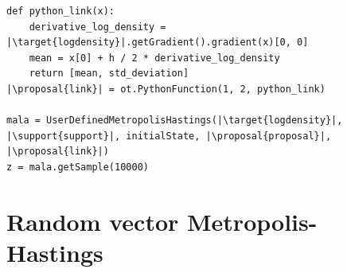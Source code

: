 \documentclass{beamer}
\newcommand{\target}[1]{\textcolor{red}{#1}}
\newcommand{\proposal}[1]{\textcolor{blue}{#1}}
\newcommand{\support}[1]{\textcolor{orange}{#1}}
\begin{document}
\begin{frame}[containsverbatim]
\begin{lstlisting}
def python_link(x):
    derivative_log_density = |\target{logdensity}|.getGradient().gradient(x)[0, 0]
    mean = x[0] + h / 2 * derivative_log_density
    return [mean, std_deviation]
|\proposal{link}| = ot.PythonFunction(1, 2, python_link)

mala = UserDefinedMetropolisHastings(|\target{logdensity}|, |\support{support}|, initialState, |\proposal{proposal}|, |\proposal{link}|)
z = mala.getSample(10000)
\end{lstlisting}

\end{frame}

\section{Random vector Metropolis-Hastings}
\end{document}
